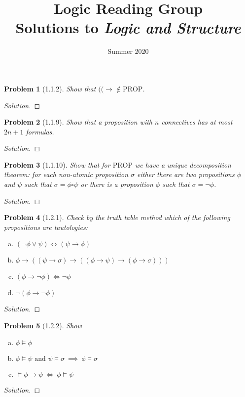 \documentclass[letter]{article}
\title{Logic Reading Group\\Solutions to \textit{Logic and Structure}}
\date{Summer 2020}
\newtheorem{problem}{Problem}
\theoremstyle{definition}
\newenvironment{solution}
{\begin{proof}[Solution]}
	{\end{proof}}
\begin{document}
\maketitle

\newpage
\begin{problem}[1.1.2]
    Show that $(( \to \not \in \textrm{PROP}$.
\end{problem}
\begin{solution}
\end{solution}

\begin{problem}[1.1.9] Show that a proposition with $n$ connectives has at most $2n + 1$ formulas.
\end{problem}
\begin{solution}
\end{solution}

\begin{problem}[1.1.10] Show that for $\textrm{PROP}$ we have a unique decomposition theorem: for each non-atomic proposition $\sigma$ either there are two propositions $\phi$ and $\psi$ such that $\sigma = \phi \square \psi$ or there is a proposition $\phi$ such that $\sigma = \neg \phi$.
\end{problem}
\begin{solution}
\end{solution}

\begin{problem}[1.2.1] Check by the truth table method which of the following propositions are tautologies:
    \begin{enumerate}[(a)]
        \item $(\neg \phi \lor \psi) \iff (\psi \to \phi)$
        \item $\phi \to ((\psi \to \sigma)
                          \to
                          ((\phi \to \psi)
                            \to (\phi \to \sigma)
                            ))$
        \item $(\phi \to \neg \phi) \iff \neg \phi$
        \item $\neg (\phi \to \neg \phi)$
    \end{enumerate}
\end{problem}
\begin{solution}
\end{solution}

\begin{problem}[1.2.2] Show
    \begin{enumerate}[(a)]
        \item $\phi \models \phi$
        \item $\phi \models \psi \textrm{ and } \psi \models \sigma \> \implies \> \phi \models \sigma$
        \item $\models \phi \to \psi \> \iff \> \phi \models \psi$
    \end{enumerate}
\end{problem}
\begin{solution}
\end{solution}
\end{document}
